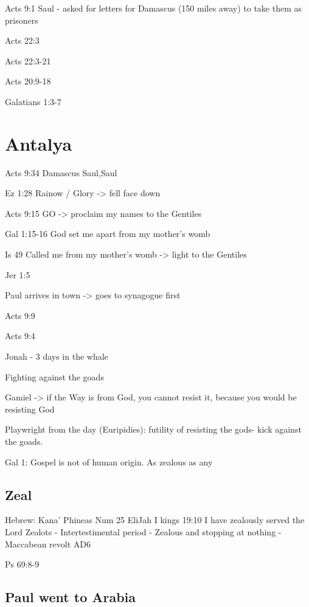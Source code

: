 \documentclass[
]{book}
\begin{document}
Acts 9:1 Saul - asked for letters for Damascus (150 miles away) to take them as prisoners

Acts 22:3

Acts 22:3-21

Acts 20:9-18

Galatians 1:3-7

\hypertarget{antalya-1}{%
\chapter{Antalya}\label{antalya-1}}

Acts 9:34 Damascus Saul,Saul

Ez 1:28 Rainow / Glory -\textgreater{} fell face down

Acts 9:15 GO -\textgreater{} proclaim my names to the Gentiles

Gal 1:15-16 God set me apart from my mother's womb

Is 49 Called me from my mother's womb -\textgreater{} light to the Gentiles

Jer 1:5

Paul arrives in town -\textgreater{} goes to synagogue first

Acts 9:9

Acts 9:4

Jonah - 3 days in the whale

Fighting against the goads

Gamiel -\textgreater{} if the Way is from God, you cannot resist it, because you would be resisting God

Playwright from the day (Euripidies): futility of resisting the gods- kick against the goads.

Gal 1: Gospel is not of human origin. As zealous as any

\hypertarget{zeal}{%
\section{Zeal}\label{zeal}}

Hebrew: Kana'
Phineas
Num 25
EliJah
I kings 19:10 I have zealously served the Lord
Zealots - Intertestimental period
- Zealous and stopping at nothing
- Maccabean revolt AD6

Ps 69:8-9

\hypertarget{paul-went-to-arabia}{%
\section{Paul went to Arabia}\label{paul-went-to-arabia}}
\end{document}

